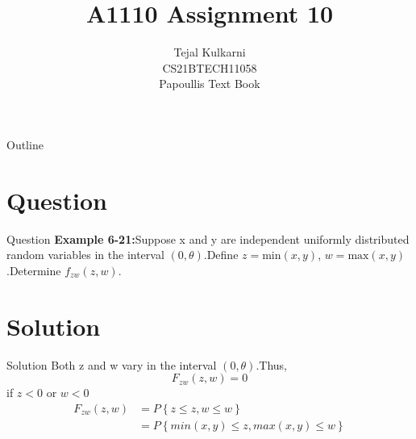\documentclass{beamer}
\title{A1110 Assignment 10}
\author{Tejal Kulkarni \\ CS21BTECH11058 \\\vspace*{20pt} Papoullis Text Book }
\begin{document}
\providecommand{\pr}[1]{\ensuremath{\Pr\left(#1\right)}}
\providecommand{\cdf}[2]{\ensuremath{\text{F}_{#1}\left(#2\right)}}
\providecommand{\qfunc}[1]{\ensuremath{Q\left(#1\right)}}
\providecommand{\sbrak}[1]{\ensuremath{{}\left[#1\right]}}
\providecommand{\lsbrak}[1]{\ensuremath{{}\left[#1\right.}}
\providecommand{\rsbrak}[1]{\ensuremath{{}\left.#1\right]}}
\providecommand{\brak}[1]{\ensuremath{\left(#1\right)}}
\providecommand{\lbrak}[1]{\ensuremath{\left(#1\right.}}
\providecommand{\cbrak}[1]{\ensuremath{\left\{#1\right\}}}
\providecommand{\lcbrak}[1]{\ensuremath{\left\{#1\right.}}
\providecommand{\rcbrak}[1]{\ensuremath{\left.#1\right\}}}
\newcommand*{\permcomb}[4][0mu]{{{}^{#3}\mkern#1#2_{#4}}}
\newcommand*{\perm}[1][-3mu]{\permcomb[#1]{P}}
\newcommand*{\comb}[1][-1mu]{\permcomb[#1]{C}}
\renewcommand{\thetable}{\arabic{table}}


\begin{frame}
    \titlepage
\end{frame}

\begin{frame}{Outline}
  \tableofcontents
\end{frame}

\section{Question}
\begin{frame}{Question}
    \textbf{Example 6-21:}Suppose x and y are independent uniformly distributed random variables in the interval $\brak{0,\theta}$.Define $z = \text{min}(x, y)$, $w = \text{max}(x, y)$.Determine $f_{zw}\brak{z,w}$.
\end{frame}

\section{Solution}
\begin{frame}{Solution}
Both z and w vary in the interval \brak{0,\theta}.Thus,
\begin{equation}
 F_{zw}\brak{z,w} = 0    
\end{equation}
if $z < 0$ or $w < 0$
\begin{align}
   F_{zw}\brak{z,w} &= P\cbrak{z \leq z , w \leq w} \\
                    &=  P\cbrak{min(x,y) \leq z, max (x, y) \leq w} 
\end{align}
\end{frame}
\end{document}
